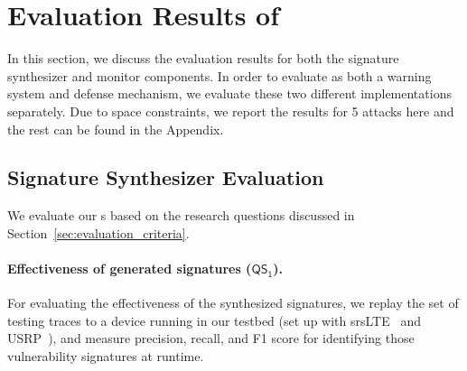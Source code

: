 \section{Evaluation Results of \system}
\label{sec:evaluation_of_phoenix}

In this section, we discuss the evaluation results for both the signature synthesizer
and monitor components. In order to evaluate \system as both a warning system
and defense mechanism, we evaluate these two different implementations separately.
Due to space constraints, we report the results for 5 attacks here and
the rest can be found in the Appendix.
\subsection{Signature Synthesizer Evaluation}
We evaluate our \signatureSynthesizer{}s based on the research questions discussed in Section~\ref{sec:evaluation_criteria}.

\paragraph{Effectiveness of generated signatures ($\mathsf{QS_1}$).}
For evaluating the effectiveness of the synthesized signatures,
we replay the set of testing traces to a device running \system in our testbed (set up with srsLTE~\cite{gomez2016srslte} and
USRP~\cite{usrp}), and measure precision, recall, and F1 score for
identifying those vulnerability signatures at runtime.
%

